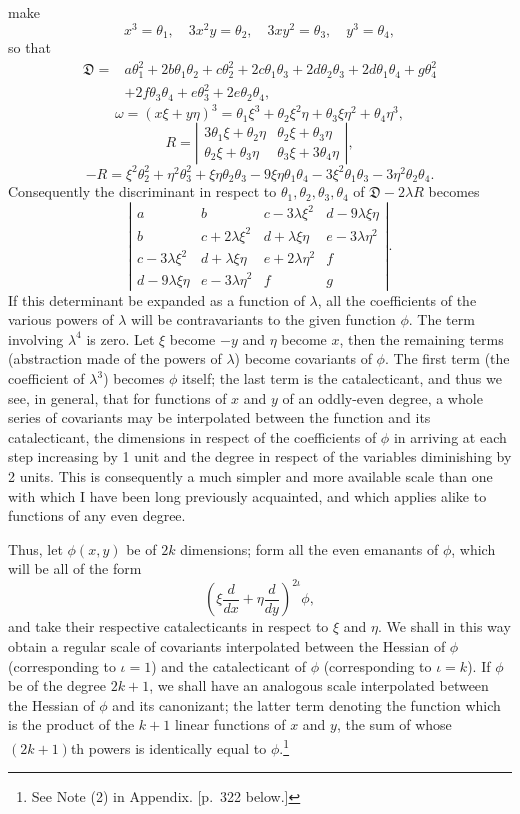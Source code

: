 \documentclass[11pt]{article}
\newcommand{\sourcepage}[1]{\marginpar{\scriptsize p.~#1}}
\begin{document}
{{\sourcepage{297}
make
\[
x^3=\theta_1,
\quad 3x^2y=\theta_2,
\quad 3xy^2=\theta_3,
\quad y^3=\theta_4,
\]
so that
\[
\begin{aligned}
\mathfrak D={}&a\theta_1^2+2b\theta_1\theta_2+c\theta_2^2+2c\theta_1\theta_3+2d\theta_2\theta_3+2d\theta_1\theta_4+g\theta_4^2\\
&+2f\theta_3\theta_4+e\theta_3^2+2e\theta_2\theta_4,
\end{aligned}
\]
\[
\omega=(x\xi+y\eta)^3=\theta_1\xi^3+\theta_2\xi^2\eta+\theta_3\xi\eta^2+\theta_4\eta^3,
\]
\[
R=\left|\begin{array}{cc}
3\theta_1\xi+\theta_2\eta&\theta_2\xi+\theta_3\eta\\
\theta_2\xi+\theta_3\eta&\theta_3\xi+3\theta_4\eta
\end{array}\right|,
\]
\[
-R=\xi^2\theta_2^2+\eta^2\theta_3^2+\xi\eta\theta_2\theta_3-9\xi\eta\theta_1\theta_4-3\xi^2\theta_1\theta_3-3\eta^2\theta_2\theta_4.
\]
Consequently the discriminant in respect to $\theta_1,\theta_2,\theta_3,\theta_4$ of $\mathfrak D-2\lambda R$ becomes
\[
\left|\begin{array}{cccc}
a&b&c-3\lambda\xi^2&d-9\lambda\xi\eta\\
b&c+2\lambda\xi^2&d+\lambda\xi\eta&e-3\lambda\eta^2\\
c-3\lambda\xi^2&d+\lambda\xi\eta&e+2\lambda\eta^2&f\\
d-9\lambda\xi\eta&e-3\lambda\eta^2&f&g
\end{array}\right|.
\]
If this determinant be expanded as a function of $\lambda$, all the coefficients of the various powers of $\lambda$ will be contravariants to the given function $\phi$. The term involving $\lambda^4$ is zero. Let $\xi$ become $-y$ and $\eta$ become $x$, then the remaining terms (abstraction made of the powers of $\lambda$) become covariants of $\phi$. The first term (the coefficient of $\lambda^3$) becomes $\phi$ itself; the last term is the catalecticant, and thus we see, in general, that for functions of $x$ and $y$ of an oddly-even degree, a whole series of covariants may be interpolated between the function and its catalecticant, the dimensions in respect of the coefficients of $\phi$ in arriving at each step increasing by 1 unit and the degree in respect of the variables diminishing by 2 units. This is consequently a much simpler and more available scale than one with which I have been long previously acquainted, and which applies alike to functions of any even degree.

Thus, let $\phi(x,y)$ be of $2k$ dimensions; form all the even emanants of $\phi$, which will be all of the form
\[
\left(\xi\frac{d}{dx}+\eta\frac{d}{dy}\right)^{2\iota}\phi,
\]
and take their respective catalecticants in respect to $\xi$ and $\eta$. We shall in this way obtain a regular scale of covariants interpolated between the Hessian of $\phi$ (corresponding to $\iota=1$) and the catalecticant of $\phi$ (corresponding to $\iota=k$). If $\phi$ be of the degree $2k+1$, we shall have an analogous scale interpolated between the Hessian of $\phi$ and its canonizant; the latter term denoting the function which is the product of the $k+1$ linear functions of $x$ and $y$, the sum of whose $(2k+1)$th powers is identically equal to $\phi$.\footnote{See Note (2) in Appendix. [p.~322 below.]}

}}
\end{document}
